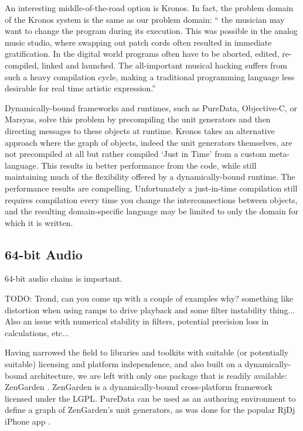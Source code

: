 \documentclass[twoside,10pt]{article}
\begin{document}
An interesting middle-of-the-road option is Kronos.  In fact, the problem domain of the Kronos system is the same as our problem domain: `` the musician may want to change the program during its execution. This was possible in the analog music studio, where swapping out patch cords often resulted in immediate gratification. In the digital world programs often have to be aborted, edited, re-compiled, linked and launched. The all-important musical hacking suffers from such a heavy compilation cycle, making a traditional programming language less desirable for real time artistic expression.'' \cite{Norilo:2009}

Dynamically-bound frameworks and runtimes, such as PureData, Objective-C, or Marsyas, solve this problem by precompiling the unit generators and then directing messages to these objects at runtime.  Kronos takes an alternative approach where the graph of objects, indeed the unit generators themselves, are not precompiled at all but rather compiled `Just in Time' from a custom meta-language. This results in better performance from the code, while still maintaining much of the flexibility offered by a dynamically-bound runtime.  The performance results are compelling.  Unfortunately a just-in-time compilation still requires compilation every time you change the interconnections between objects, and the resulting domain-specific language may be limited to only the domain for which it is written.



\subsection{64-bit Audio} %

64-bit audio chains is important.

TODO: Trond, can you come up with a couple of examples why?  something like distortion when using ramps to drive playback and some filter instability thing... Also an issue with numerical stability in filters, potential precision loss in calculations, etc...

Having narrowed the field to libraries and toolkits with suitable (or potentially suitable) licensing and platform independence, and also built on a dynamically-bound architecture, we are left with only one package that is readily available: ZenGarden \cite{web4}%
  .  ZenGarden is a dynamically-bound cross-platform framework licensed under the LGPL.  PureData can be used as an authoring environment to define a graph of ZenGarden's unit generators, as was done for the popular RjDj iPhone app \cite{web5}.%
\end{document}
